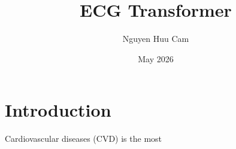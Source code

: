 \documentclass{article}
\title{ECG Transformer}
\author{Nguyen Huu Cam}
\date{May 2026}
\begin{document}
\maketitle

\section{Introduction}
Cardiovascular diseases (CVD) is the most 
\end{document}

